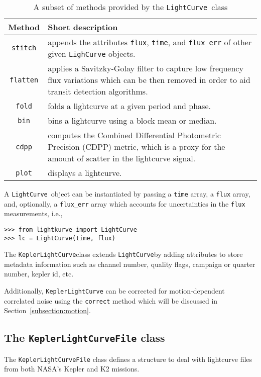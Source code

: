 \documentclass[twocolumn]{aastex62}
\newcommand{\LightCurve}{\texttt{LightCurve}}
\newcommand{\KeplerLightCurve}{\texttt{KeplerLightCurve}}
\begin{document}
        \begin{table}[!htb]
            \centering
            \caption{A subset of methods provided by the \LightCurve~class}
            \begin{tabular}{cp{6.5cm}}
                \hline
                \textbf{Method} & \textbf{Short description} \\
                \hline
                \texttt{stitch} & appends the attributes \texttt{flux},
                \texttt{time}, and \texttt{flux\_err} of other given
                \texttt{LighCurve} objects.\\
                \texttt{flatten} & applies a Savitzky-Golay filter to capture
                low frequency flux variations which can be then removed in order
                to aid transit detection algorithms.\\
                \texttt{fold} & folds a lightcurve at a given period and phase.\\
                \texttt{bin} &  bins a lightcurve using a block mean or median.\\
                \texttt{cdpp} &  computes the Combined Differential Photometric
                Precision (CDPP) metric, which is a proxy for the amount of
                scatter in the lightcurve signal. \\
                \texttt{plot} & displays a lightcurve.
            \end{tabular}
            \label{tab:methods}
        \end{table}

        A \LightCurve~object can be instantiated by passing a \texttt{time}
        array, a \texttt{flux} array, and, optionally, a \texttt{flux\_err} array
        which accounts for uncertainties in the \texttt{flux} measurements, i.e.,
\begin{verbatim}
>>> from lightkurve import LightCurve
>>> lc = LightCurve(time, flux)
\end{verbatim}

       The \KeplerLightCurve class extends \LightCurve by
       adding attributes to store metadata information such as channel number,
       quality flags, campaign or quarter number, kepler id, etc.

       Additionally, \texttt{KeplerLightCurve} can be corrected for motion-dependent
       correlated noise using the \texttt{correct} method which will be discussed in
       Section~\ref{subsection:motion}.

   \subsection{The \texttt{KeplerLightCurveFile} class}
        The \texttt{KeplerLightCurveFile} class defines a structure to deal
        with lightcurve files from both NASA's Kepler and K2 missions.
\end{document}
